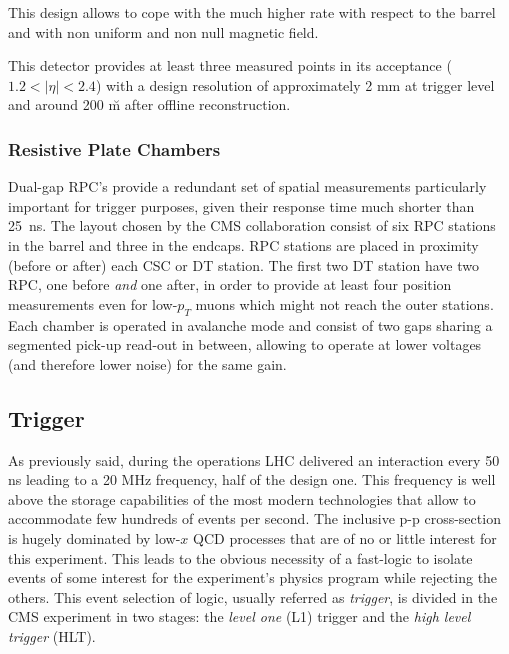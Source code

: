 This design allows to cope with the much higher rate with respect to the barrel and with non uniform and non null magnetic field. 

This detector provides at least three measured points in its acceptance ($1.2 < |\eta| < 2.4$) with a design resolution of approximately 2 mm at trigger level and around 200 \u m after offline reconstruction.

\subsubsection*{Resistive Plate Chambers}

Dual-gap RPC's provide a redundant set of spatial measurements particularly important for trigger purposes, given their response time much shorter than 25~ns. The layout chosen by the CMS collaboration consist of six RPC stations in the barrel and three in the endcaps. RPC stations are placed in proximity (before or after) each CSC or DT station. The first two DT station have two RPC, one before \emph{and} one after, in order to provide at least four position measurements even for low-$p_T$ muons which might not reach the outer stations. Each chamber is operated in avalanche mode and consist of two gaps sharing a segmented pick-up read-out in between, allowing to operate at lower voltages (and therefore lower noise) for the same gain. 

\subsection{Trigger}

As previously said, during the operations LHC delivered an interaction every 50 ns leading to a 20 MHz frequency, half of the design one.
This frequency is well above the storage capabilities of the most modern technologies that allow to accommodate few hundreds of events per second. The inclusive p-p cross-section is hugely dominated by low-$x$ QCD processes that are of no or little interest for this experiment. This leads to the obvious necessity of a fast-logic to isolate events of some interest for the experiment's physics program while rejecting the others. This event selection of logic, usually referred as \emph{trigger}, is divided in the CMS experiment in two stages: the \emph{level one} (L1) trigger and the \emph{high level trigger} (HLT). 

